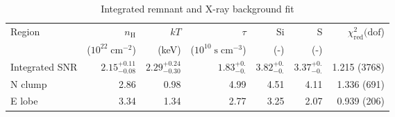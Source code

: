 \documentclass[preprint2,tighten,trackchanges]{aastex6}
\newcommand*{\mt}{\mathrm}
\newcommand*{\unit}[1]{\;\mt{#1}}  %
\newcommand*{\abt}{\mathord{\sim}} %
\begin{document}

\begin{table*}
    \centering
    \caption{Integrated remnant and X-ray background fit
    \label{tab:fits}}
    \begin{tabular}{@{}lrrrrrr@{}}
        \toprule
        Region & $n_\mathrm{H}$             & $kT$  & $\tau$   & Si  & S   & $\chi^2_{\mathrm{red}} (\mathrm{dof}$) \\
               & ($10^{22} \unit{cm^{-2}}$) & (keV) & ($10^{10} \unit{s\;cm^{-3}}$) & (-) & (-) &  \\
        \midrule
        Integrated SNR %
            & ${2.15}^{+0.11}_{-0.08}$ %
            & ${2.29}^{+0.24}_{-0.30}$ %
            & ${1.83}^{+0.}_{-0.}$ %
            & ${3.82}^{+0.}_{-0.}$ %
            & ${3.37}^{+0.}_{-0.}$ %
            & 1.215 (3768) \\  %
        \midrule
        N clump & 2.86 & 0.98 & 4.99 & 4.51 & 4.11 & 1.336 (691) \\  %
        E lobe  & 3.34 & 1.34 & 2.77 & 3.25 & 2.07 & 0.939 (206) \\  %

\end{tabular}
\end{table*}
\end{document}
